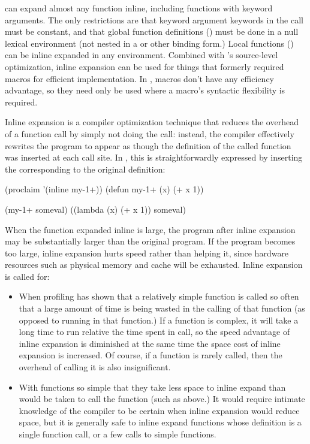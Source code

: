 \python{} can expand almost any function inline, including functions
with keyword arguments.  The only restrictions are that keyword
argument keywords in the call must be constant, and that global
function definitions () must be done in a null lexical
environment (not nested in a  or other binding form.)  Local
functions () can be inline expanded in any environment.
Combined with \python{}'s source-level optimization, inline expansion
can be used for things that formerly required macros for efficient
implementation.  In \python, macros don't have any efficiency
advantage, so they need only be used where a macro's syntactic
flexibility is required.

Inline expansion is a compiler optimization technique that reduces
the overhead of a function call by simply not doing the call:
instead, the compiler effectively rewrites the program to appear as
though the definition of the called function was inserted at each
call site.  In \llisp, this is straightforwardly expressed by
inserting the  corresponding to the original definition:
\begin{lisp}
(proclaim '(inline my-1+))
(defun my-1+ (x) (+ x 1))

(my-1+ someval) \result{} ((lambda (x) (+ x 1)) someval)
\end{lisp}

When the function expanded inline is large, the program after inline
expansion may be substantially larger than the original program.  If
the program becomes too large, inline expansion hurts speed rather
than helping it, since hardware resources such as physical memory and
cache will be exhausted.  Inline expansion is called for:
\begin{itemize}
  
\item When profiling has shown that a relatively simple function is
  called so often that a large amount of time is being wasted in the
  calling of that function (as opposed to running in that function.)
  If a function is complex, it will take a long time to run relative
  the time spent in call, so the speed advantage of inline expansion
  is diminished at the same time the space cost of inline expansion is
  increased.  Of course, if a function is rarely called, then the
  overhead of calling it is also insignificant.
  
\item With functions so simple that they take less space to inline
  expand than would be taken to call the function (such as
   above.)  It would require intimate knowledge of the
  compiler to be certain when inline expansion would reduce space, but
  it is generally safe to inline expand functions whose definition is
  a single function call, or a few calls to simple \clisp{} functions.
\end{itemize}


